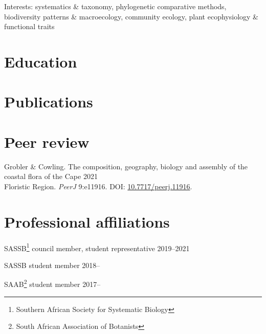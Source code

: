 \documentclass[10pt]{article}
\begin{document}

Interests:
  systematics \& taxonomy,
  phylogenetic comparative methods,
  biodiversity patterns \& macroecology,
  community ecology,
  plant ecophysiology \& functional traits


\section*{Education} %



\section*{Publications} %



\section*{Peer review} %

Grobler \& Cowling. The composition, geography, biology and assembly of the
  coastal flora of the Cape                                       \hfill 2021 \\
  \hspace{2em} Floristic Region. \textit{PeerJ} 9:e11916. DOI:
    \href{https://doi.org/10.7717/peerj.11916}{10.7717/peerj.11916}.

\section*{Professional affiliations} %

SASSB\footnote{Southern African Society for Systematic Biology}
  council member, student representative                       \hfill 2019--2021

SASSB student member                                               \hfill 2018--

SAAB\footnote{South African Association of Botanists}
  student member                                                   \hfill 2017--
\end{document}
